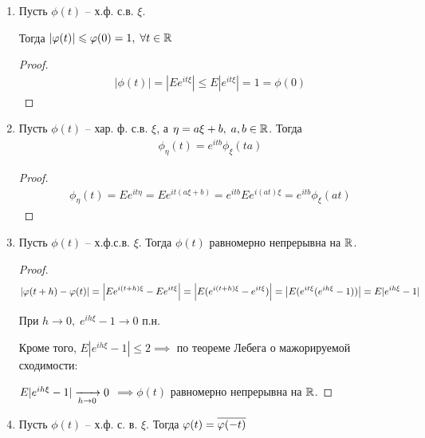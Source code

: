 
\begin{enumerate}[label=\protect\circled{\arabic*},series=charfunc_properties]
  \item
    Пусть $\phi(t)$ -- х.ф. с.в. $\xi$. 

    Тогда $|\varphi(t)| \leqslant \varphi(0) = 1, \; \forall t \in \mathbb{R}$
    \begin{proof}
      \begin{align*}
        |\phi(t)| = |E e^{i t \xi}| \leq E |e^{i t \xi}| = 1 = \phi(0)
      \end{align*}
    \end{proof}

  \item 
    Пусть $\phi(t)$ -- хар. ф. с.в. $\xi$, а $\eta = a \xi + b, \; a, b \in \mathbb{R}$.
    Тогда
    \begin{align*}
      \phi_{\eta} (t) = e^{i t b} \phi_{\xi} (t a)
    \end{align*}

    \begin{proof}
      \begin{align*}
        \phi_{\eta} (t) = E e^{i t \eta} = E e^{i t (a \xi + b)} 
        = e^{i t b} E e^{i (a t) \xi} = e^{i t b} \phi_\xi (at)
      \end{align*}
    \end{proof}

  \item
    Пусть $\phi(t)$ -- х.ф.с.в. $\xi$. 
    Тогда $\phi(t)$ равномерно непрерывна на $\mathbb{R}$.

    \begin{proof}
      \begin{align*}
        |\varphi(t + h) - \varphi(t)| = \left | E e^{i (t + h) \xi} - E e^{i t \xi} \right | 
        = \left | E(e^{i(t + h)\xi} - e^{i t \xi}) \right | = \left | E(e^{i t \xi} (e^{i h \xi} - 1)) \right |
        = E |e^{i h \xi} - 1|
      \end{align*}
      
      При $h \to 0, \; e^{i h \xi} - 1 \to 0$ п.н. 

      Кроме того, $E|e^{i h \xi} - 1| \leq 2 \implies$
      по теореме Лебега о мажорируемой сходимости:

      $E|e^{i h \xi} - 1| \xrightarrow[h \to 0]{} 0$ 
      $\implies \phi(t)$  равномерно непрерывна на $\mathbb{R}$.
    \end{proof}

  \item
    Пусть $\phi(t)$ -- х.ф. с. в. $\xi$. Тогда $\varphi(t) = \overline{\varphi(-t)}$


\end{enumerate}
